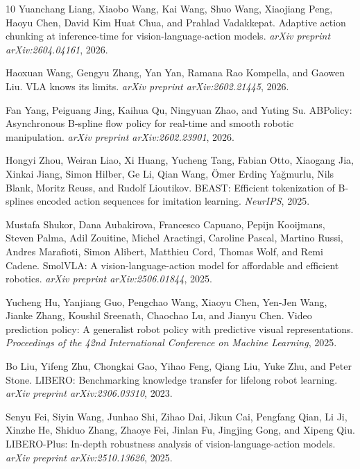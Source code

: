\documentclass[10pt,twocolumn,letterpaper]{article}
\begin{document}
\begin{thebibliography}{10}
Yuanchang Liang, Xiaobo Wang, Kai Wang, Shuo Wang, Xiaojiang Peng, Haoyu Chen, David Kim Huat Chua, and Prahlad Vadakkepat.
\newblock Adaptive action chunking at inference-time for vision-language-action models.
\newblock \emph{arXiv preprint arXiv:2604.04161}, 2026.

Haoxuan Wang, Gengyu Zhang, Yan Yan, Ramana Rao Kompella, and Gaowen Liu.
\newblock VLA knows its limits.
\newblock \emph{arXiv preprint arXiv:2602.21445}, 2026.

Fan Yang, Peiguang Jing, Kaihua Qu, Ningyuan Zhao, and Yuting Su.
\newblock ABPolicy: Asynchronous B-spline flow policy for real-time and smooth robotic manipulation.
\newblock \emph{arXiv preprint arXiv:2602.23901}, 2026.

Hongyi Zhou, Weiran Liao, Xi Huang, Yucheng Tang, Fabian Otto, Xiaogang Jia, Xinkai Jiang, Simon Hilber, Ge Li, Qian Wang, {\"O}mer Erdin\c{c} Ya{\u g}murlu, Nils Blank, Moritz Reuss, and Rudolf Lioutikov.
\newblock BEAST: Efficient tokenization of B-splines encoded action sequences for imitation learning.
\newblock \emph{NeurIPS}, 2025.

Mustafa Shukor, Dana Aubakirova, Francesco Capuano, Pepijn Kooijmans, Steven Palma, Adil Zouitine, Michel Aractingi, Caroline Pascal, Martino Russi, Andres Marafioti, Simon Alibert, Matthieu Cord, Thomas Wolf, and Remi Cadene.
\newblock SmolVLA: A vision-language-action model for affordable and efficient robotics.
\newblock \emph{arXiv preprint arXiv:2506.01844}, 2025.

Yucheng Hu, Yanjiang Guo, Pengchao Wang, Xiaoyu Chen, Yen-Jen Wang, Jianke Zhang, Koushil Sreenath, Chaochao Lu, and Jianyu Chen.
\newblock Video prediction policy: A generalist robot policy with predictive visual representations.
\newblock \emph{Proceedings of the 42nd International Conference on Machine Learning}, 2025.

Bo Liu, Yifeng Zhu, Chongkai Gao, Yihao Feng, Qiang Liu, Yuke Zhu, and Peter Stone.
\newblock LIBERO: Benchmarking knowledge transfer for lifelong robot learning.
\newblock \emph{arXiv preprint arXiv:2306.03310}, 2023.

Senyu Fei, Siyin Wang, Junhao Shi, Zihao Dai, Jikun Cai, Pengfang Qian, Li Ji, Xinzhe He, Shiduo Zhang, Zhaoye Fei, Jinlan Fu, Jingjing Gong, and Xipeng Qiu.
\newblock LIBERO-Plus: In-depth robustness analysis of vision-language-action models.
\newblock \emph{arXiv preprint arXiv:2510.13626}, 2025.


\end{thebibliography}
\end{document}
